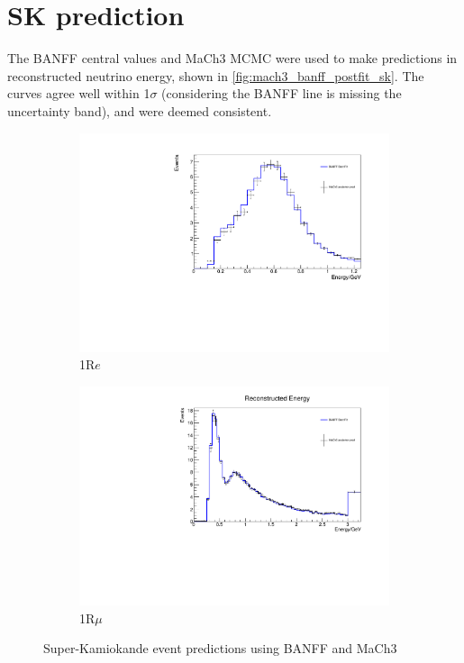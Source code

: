\section{SK prediction}
The BANFF central values and MaCh3 MCMC were used to make predictions in reconstructed neutrino energy, shown in \autoref{fig:mach3_banff_postfit_sk}. The curves agree well within 1$\sigma$ (considering the BANFF line is missing the uncertainty band), and were deemed consistent.
\begin{figure}
\begin{subfigure}[t]{0.49\textwidth}
	\includegraphics[width=\textwidth, trim={0mm 0mm 0mm 0mm}, clip, page=1]{figures/mach3/banff/1ReFHCPP}
	\caption{1R$e$}
\end{subfigure}
\begin{subfigure}[t]{0.49\textwidth}
	\includegraphics[width=\textwidth, trim={0mm 0mm 0mm 0mm}, clip, page=1]{figures/mach3/banff/1RmuFHCPP}
	\caption{1R$\mu$}
\end{subfigure}
\caption{Super-Kamiokande event predictions using BANFF and MaCh3}
\label{fig:mach3_banff_postfit_sk}
\end{figure}